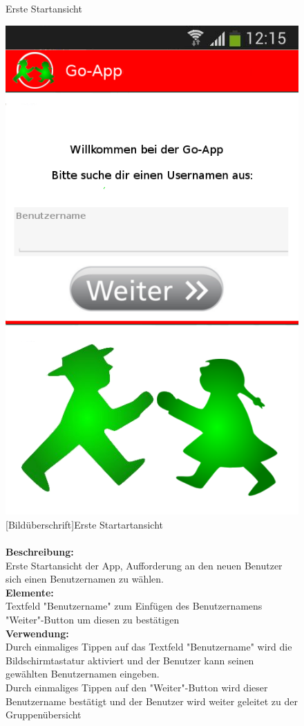 \begin{figure} [H]
\caption{Erste Startansicht}
\includegraphics[scale = 0.5]{resources/images/startansicht.png}
\caption{
	[Bildüberschrift]Erste Startartansicht\\ \\

	\textbf{Beschreibung:}\\
	Erste Startansicht der App, Aufforderung an den neuen Benutzer sich einen Benutzernamen zu wählen.\\
	\textbf{Elemente:}\\
	Textfeld "Benutzername" zum Einfügen des Benutzernamens\\
	"Weiter"-Button um diesen zu bestätigen\\
	\textbf{Verwendung:}\\
	Durch einmaliges Tippen auf das Textfeld "Benutzername" wird die Bildschirmtastatur aktiviert und der Benutzer kann seinen gewählten Benutzernamen eingeben.\\
	Durch einmaliges Tippen auf den "Weiter"-Button wird dieser Benutzername bestätigt und der Benutzer wird weiter geleitet zu der Gruppenübersicht\\ \\
	
}
\end{figure}

